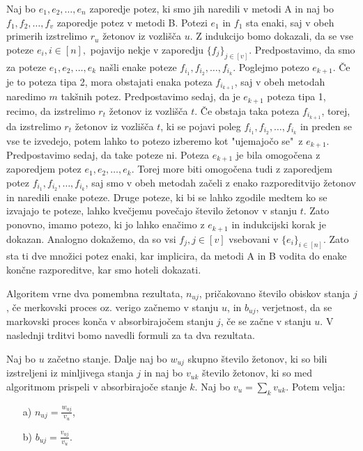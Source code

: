 \documentclass[twoside,11pt]{article}
\begin{document}
\indent Naj bo $e_{1},e_{2},\ldots,e_{n}$ zaporedje potez, ki smo jih naredili v metodi A in naj bo $f_{1},f_{2},\ldots,f_{v}$ zaporedje potez v metodi B. Potezi $e_{1}$ in $f_{1}$ sta enaki, saj v obeh primerih izstrelimo $r_{u}$ žetonov iz vozlišča $u$. Z indukcijo bomo dokazali, da se vse poteze $e_{i}, i \in [n], $ pojavijo nekje v zaporedju $\{ f_{j}\} _{j\in [v] }$. Predpostavimo, da smo za poteze $e_{1},e_{2},\ldots,e_{k}$ našli enake poteze $f_{i_1},f_{i_2},\ldots,f_{i_k}$. Poglejmo potezo $e_{k+1}$. Če je to poteza tipa 2, mora obstajati enaka poteza $f_{i_{k+1}}$, saj v obeh metodah naredimo $m$ takšnih potez.
Predpostavimo sedaj, da je $e_{k+1}$ poteza tipa 1, recimo, da izstrelimo $r_{t}$ žetonov iz vozlišča $t$. Če obstaja taka poteza $f_{i_{k+1}}$, torej, da izstrelimo $r_{t}$ žetonov iz vozlišča $t$, ki se pojavi poleg $f_{i_1},f_{i_2},\ldots,f_{i_k}$ in preden se vse te izvedejo, potem lahko to potezo izberemo kot "ujemajočo se" \,z $e_{k+1}$. Predpostavimo sedaj, da take poteze ni. Poteza $e_{k+1}$ je bila omogočena z zaporedjem potez $e_{1},e_{2},\ldots,e_{k}$. Torej more biti omogočena tudi z zaporedjem potez $f_{i_1},f_{i_2},\ldots,f_{i_k}$, saj smo v obeh metodah začeli z enako razporeditvijo žetonov in naredili enake poteze. Druge poteze, ki bi se lahko zgodile medtem ko se izvajajo te poteze, lahko kvečjemu povečajo število žetonov v stanju $t$. 
Zato ponovno, imamo potezo, ki jo lahko enačimo z $e_{k+1}$ in indukcijski korak je dokazan. Analogno dokažemo, da so vsi $f_{j}, j \in [v] $ vsebovani v $\{e_{i} \}_{i\in [n] }$. Zato sta ti dve množici potez enaki, kar implicira, da metodi A in B vodita do enake končne razporeditve, kar smo hoteli dokazati.
\hfill \QED

\vspace{\baselineskip}

Algoritem vrne dva pomembna rezultata, $n_{uj}$, pričakovano število obiskov stanja $j$, če merkovski proces oz. verigo začnemo v stanju $u$, in $b_{uj}$, verjetnost, da se markovski proces konča v absorbirajočem stanju $j$, če se začne v stanju $u$. V naslednji trditvi bomo navedli formuli za ta dva rezultata.

\begin{trditev}\label{formule}
    Naj bo $u$ začetno stanje. Dalje naj bo $w_{uj}$ skupno število žetonov, ki so bili izstreljeni iz minljivega stanja $j$ in naj bo $v_{uk}$ število žetonov, ki so med algoritmom prispeli v absorbirajoče stanje $k$. Naj bo $v_{u} = \sum_{k} v_{uk}$. Potem velja: 
    \begin{enumerate}
        \item[a)] $n_{uj} = \frac{w_{uj}}{v_{u}}$,
        \item[b)] $b_{uj} = \frac{v_{uj}}{v_{u}}$.
    \end{enumerate}

\end{trditev}
\end{document}
